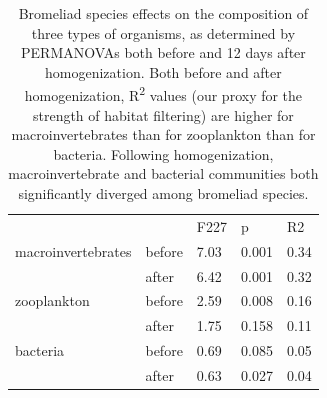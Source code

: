 \begin{center} 
\begin{table}[h] 
\caption[Bromeliad species effects on the composition of three groups of organisms]{Bromeliad species effects on the composition of three types of
organisms, as determined by PERMANOVAs both before and 12 days after
homogenization. Both before and after homogenization,
R\textsuperscript{2} values (our proxy for the strength of habitat
filtering) are higher for macroinvertebrates than for zooplankton than
for bacteria. Following homogenization, macroinvertebrate and bacterial
communities both significantly diverged among bromeliad species.} 
\label{table:r2s} 
\vspace{10pt} 
\begin{tabular}[c]{l l l l l} 
\hline 
& & F227 & p & R2 \\
macroinvertebrates & before & 7.03 & 0.001 & 0.34 \\
& after & 6.42 & 0.001 & 0.32 \\
zooplankton & before & 2.59 & 0.008 & 0.16 \\
& after & 1.75 & 0.158 & 0.11 \\
bacteria & before & 0.69 & 0.085 & 0.05 \\
& after & 0.63 & 0.027 & 0.04 \\
\end{tabular}
\label{tab:rsquares} 
\end{table} 
\end{center} 

